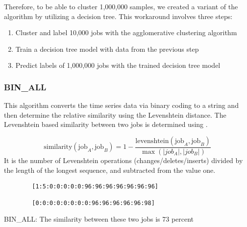 \documentclass{jhps}
\begin{document}
Therefore, to be able to cluster 1,000,000 samples, we created a variant of the algorithm by utilizing a decision tree.
This workaround involves three steps:

\begin{enumerate}
 \item Cluster and label 10,000 jobs with the agglomerative clustering algorithm
 \item Train a decision tree model with data from the previous step
 \item Predict labels of 1,000,000 jobs with the trained decision tree model
\end{enumerate}

\subsubsection{BIN\_ALL}
This algorithm converts the time series data via binary coding to a string and then determine the relative similarity using the Levenshtein distance.
The Levenshtein based similarity between two jobs is determined using .

\begin{equation}
	\text{similarity}\left(\text{job}_{A},\text{job}_{B} \right) = 1 - \frac{\text{levenshtein}\left(\text{job}_{A},\text{job}_{B} \right) }{\max \left(|job_{A}|,|job_{B}| \right) } \label{eq:sim:bin_all}
\end{equation}
It is the number of Levenshtein operations (changes/deletes/inserts) divided by the length of the longest sequence, and subtracted from the value one.


\begin{listing}
	\noindent\begin{minipage}{0.50\textwidth}
		\begin{lstlisting}
		[1:5:0:0:0:0:0:96:96:96:96:96:96:96]
		\end{lstlisting}
		\vspace{-2em}
		\label{lst:test:a}
	\end{minipage}
	\hfill
	\noindent\begin{minipage}{0.50\textwidth}
		\begin{lstlisting}
		[0:0:0:0:0:0:0:0:96:96:96:96:96:98]
		\end{lstlisting}
		\vspace{-2em}
		\label{lst:test:b}
	\end{minipage}
	\caption{BIN\_ALL: The similarity between these two jobs is 73 percent}
	\label{lst:test}
\end{listing}
\end{document}
